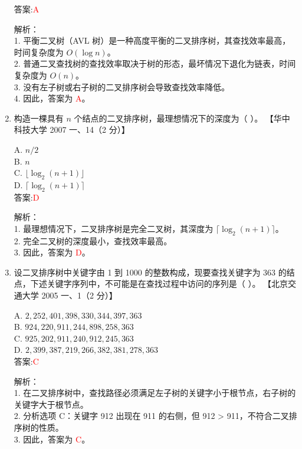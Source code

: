 \documentclass[lang=cn,newtx,10pt,scheme=chinese]{../../../elegantbook}
\begin{document}
\begin{enumerate}
    答案:\textcolor{red}{A}

    解析：\\
    1. 平衡二叉树（AVL 树）是一种高度平衡的二叉排序树，其查找效率最高，时间复杂度为 $O(\log n)$。\\
    2. 普通二叉查找树的查找效率取决于树的形态，最坏情况下退化为链表，时间复杂度为 $O(n)$。\\
    3. 没有左子树或右子树的二叉排序树会导致查找效率降低。\\
    4. 因此，答案为 \textcolor{red}{A}。\\

\item 构造一棵具有 $n$ 个结点的二叉排序树，最理想情况下的深度为（ ）。  
    【华中科技大学 2007 一、14（2 分）】  

    A. $n/2$ \\  
    B. $n$ \\  
    C. $\lfloor \log_2(n+1) \rfloor$ \\  
    D. $\lceil \log_2(n+1) \rceil$ \\  

    答案:\textcolor{red}{D}

    解析：\\
    1. 最理想情况下，二叉排序树是完全二叉树，其深度为 $\lceil \log_2(n+1) \rceil$。\\
    2. 完全二叉树的深度最小，查找效率最高。\\
    3. 因此，答案为 \textcolor{red}{D}。\\

\item 设二叉排序树中关键字由 1 到 1000 的整数构成，现要查找关键字为 363 的结点，下述关键字序列中，不可能是在查找过程中访问的序列是（ ）。  
    【北京交通大学 2005 一、1（2 分）】  

    A. $2, 252, 401, 398, 330, 344, 397, 363$ \\  
    B. $924, 220, 911, 244, 898, 258, 363$ \\  
    C. $925, 202, 911, 240, 912, 245, 363$ \\  
    D. $2, 399, 387, 219, 266, 382, 381, 278, 363$ \\  

    答案:\textcolor{red}{C}

    解析：\\
    1. 在二叉排序树中，查找路径必须满足左子树的关键字小于根节点，右子树的关键字大于根节点。\\
    2. 分析选项 C：关键字 912 出现在 911 的右侧，但 912 > 911，不符合二叉排序树的性质。\\
    3. 因此，答案为 \textcolor{red}{C}。\\


\end{enumerate}
\end{document}

